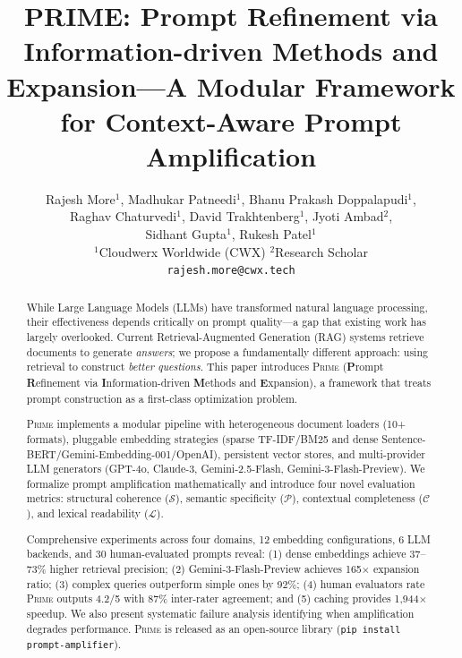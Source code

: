 \documentclass[11pt,a4paper]{article}
\title{PRIME: Prompt Refinement via Information-driven Methods and Expansion---A Modular Framework for Context-Aware Prompt Amplification}
\author{
Rajesh More$^{1}$, Madhukar Patneedi$^{1}$, Bhanu Prakash Doppalapudi$^{1}$, \\
Raghav Chaturvedi$^{1}$, David Trakhtenberg$^{1}$, Jyoti Ambad$^{2}$, \\
Sidhant Gupta$^{1}$, Rukesh Patel$^{1}$ \\[1em]
$^{1}$Cloudwerx Worldwide (CWX) \quad $^{2}$Research Scholar \\
\texttt{rajesh.more@cwx.tech}
}
\newcommand{\primesys}{\textsc{Prime}}
\begin{document}
\maketitle

\begin{abstract}
While Large Language Models (LLMs) have transformed natural language processing, their effectiveness depends critically on prompt quality---a gap that existing work has largely overlooked. Current Retrieval-Augmented Generation (RAG) systems retrieve documents to generate \textit{answers}; we propose a fundamentally different approach: using retrieval to construct \textit{better questions}. This paper introduces \primesys{} (\textbf{P}rompt \textbf{R}efinement via \textbf{I}nformation-driven \textbf{M}ethods and \textbf{E}xpansion), a framework that treats prompt construction as a first-class optimization problem.

\primesys{} implements a modular pipeline with heterogeneous document loaders (10+ formats), pluggable embedding strategies (sparse TF-IDF/BM25 and dense Sentence-BERT/Gemini-Embedding-001/OpenAI), persistent vector stores, and multi-provider LLM generators (GPT-4o, Claude-3, Gemini-2.5-Flash, Gemini-3-Flash-Preview). We formalize prompt amplification mathematically and introduce four novel evaluation metrics: structural coherence ($\mathcal{S}$), semantic specificity ($\mathcal{P}$), contextual completeness ($\mathcal{C}$), and lexical readability ($\mathcal{L}$).

Comprehensive experiments across four domains, 12 embedding configurations, 6 LLM backends, and 30 human-evaluated prompts reveal: (1) dense embeddings achieve 37--73\% higher retrieval precision; (2) Gemini-3-Flash-Preview achieves 165$\times$ expansion ratio; (3) complex queries outperform simple ones by 92\%; (4) human evaluators rate \primesys{} outputs 4.2/5 with 87\% inter-rater agreement; and (5) caching provides 1,944$\times$ speedup. We also present systematic failure analysis identifying when amplification degrades performance. \primesys{} is released as an open-source library (\texttt{pip install prompt-amplifier}).

\end{abstract}

\end{document}
